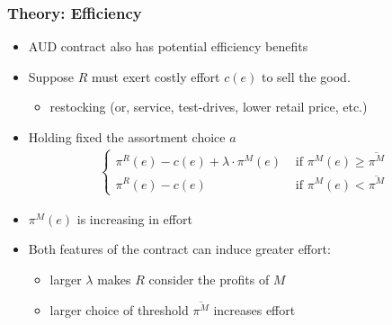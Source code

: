 \documentclass[aspectratio=169]{beamer}
\begin{document}

\begin{frame}
\frametitle{Theory: Efficiency}
\begin{itemize}
\item AUD contract also has potential efficiency benefits
\item Suppose $R$ must exert costly effort $c(e)$ to sell the good.
\begin{itemize}
\item restocking (or, service, test-drives, lower retail price, etc.)
\end{itemize}
\item Holding fixed the assortment choice $a$
\begin{eqnarray*}
\label{effortchoice}
\begin{cases}
 \pi^R(e) -c(e) + \lambda \cdot \pi^M(e) &\mbox{ if } \pi^M(e) \geq \overline{\pi^M}\\
 \pi^R(e)  -c(e)   &\mbox{ if } \pi^M(e) < \overline{\pi^M}
\end{cases}
\end{eqnarray*}
\item $\pi^M(e)$ is increasing in effort
\item Both features of the contract can induce greater effort: 
\begin{itemize}
\item larger $\lambda$ makes $R$ consider the profits of $M$
\item larger choice of threshold $\overline{\pi^M}$ increases effort
\end{itemize}
\end{itemize}
\end{frame}
\end{document}
